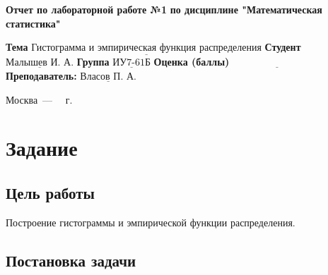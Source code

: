\documentclass[12pt]{report}
\begin{document}
\begin{titlepage}
		
		\begin{center}
			\noindent\begin{minipage}{1.3\textwidth}\centering
				\Large\textbf{  Отчет по лабораторной работе №1}\newline
				\textbf{по дисциплине \newline "Математическая статистика"}\newline\newline
			\end{minipage}
		\end{center}
		
		\noindent\textbf{Тема} $\underline{\text{Гистограмма и эмпирическая функция распределения}}$\newline\newline
		\noindent\textbf{Студент} $\underline{\text{Малышев И. А.}}$\newline\newline
		\noindent\textbf{Группа} $\underline{\text{ИУ7-61Б}}$\newline\newline
		\noindent\textbf{Оценка (баллы)} $\underline{\text{~~~~~~~~~~~~~~~~~~~~~~~~~~~}}$\newline\newline
		\noindent\textbf{Преподаватель: } $\underline{\text{Власов П. А.}}$\newline\newline\newline
		
		\begin{center}
			\vfill
			Москва~---~\the\year
			~г.
		\end{center}
	\end{titlepage}
	
\setcounter{page}{2}

\chapter*{Задание}

\section*{Цель работы}
Построение гистограммы и эмпирической функции распределения.

\section*{Постановка задачи}
\end{document}
